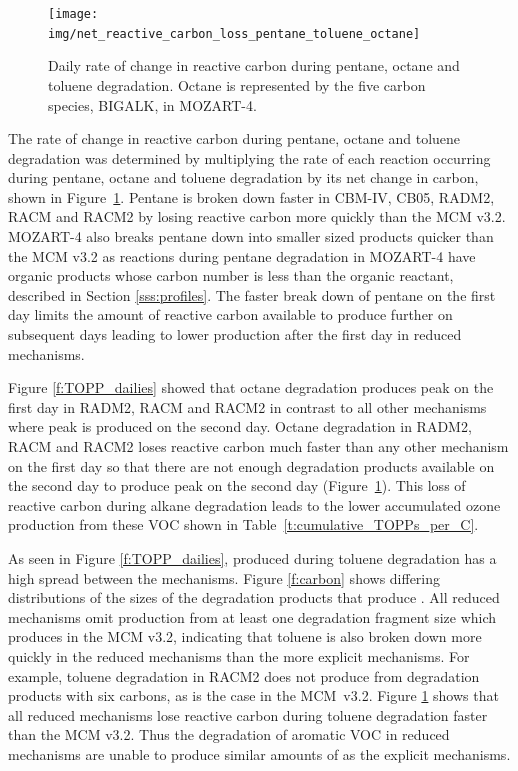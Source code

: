 %
\begin{figure}
    \centering
    \caption{Daily rate of change in reactive carbon during pentane, octane and toluene degradation. Octane is represented by the five carbon species, BIGALK, in MOZART-4.}
    \texttt{[image: img/net\_reactive\_carbon\_loss\_pentane\_toluene\_octane]}
    \vspace{-2mm}
    \label{f:net_carbon_loss}
\end{figure}
The rate of change in reactive carbon during pentane, octane and toluene degradation was determined by multiplying the rate of each reaction occurring during pentane, octane and toluene degradation by its net change in carbon, shown in \mbox{Figure \ref{f:net_carbon_loss}}.
Pentane is broken down faster in CBM-IV, CB05, RADM2, RACM and RACM2 by losing reactive carbon more quickly than the MCM v3.2.
MOZART-4 also breaks pentane down into smaller sized products quicker than the MCM v3.2 as reactions during pentane degradation in MOZART-4 have organic products whose carbon number is less than the organic reactant, described in Section \ref{sss:profiles}.
The faster break down of pentane on the first day limits the amount of reactive carbon available to produce further  on subsequent days leading to lower  production after the first day in reduced mechanisms.

Figure \ref{f:TOPP_dailies} showed that octane degradation produces peak  on the first day in RADM2, RACM and RACM2 in contrast to all other mechanisms where peak  is produced on the second day.
Octane degradation in RADM2, RACM and RACM2 loses reactive carbon much faster than any other mechanism on the first day so that there are not enough degradation products available on the second day to produce peak  on the second day (\mbox{Figure \ref{f:net_carbon_loss}}).
This loss of reactive carbon during alkane degradation leads to the lower accumulated ozone production from these VOC shown in \mbox{Table \ref{t:cumulative_TOPPs_per_C}}.

As seen in Figure \ref{f:TOPP_dailies},  produced during toluene degradation has a high spread between the mechanisms.
Figure \ref{f:carbon} shows differing distributions of the sizes of the degradation products that produce .
All reduced mechanisms omit  production from at least one degradation fragment size which produces  in the MCM v3.2, indicating that toluene is also broken down more quickly in the reduced mechanisms than the more explicit mechanisms.
For example, toluene degradation in RACM2 does not produce  from degradation products with six carbons, as is the case in the \mbox{MCM v3.2}.  
Figure \ref{f:net_carbon_loss} shows that all reduced mechanisms lose reactive carbon during toluene degradation faster than the MCM v3.2.
Thus the degradation of aromatic VOC in reduced mechanisms are unable to produce similar amounts of  as the explicit mechanisms.
